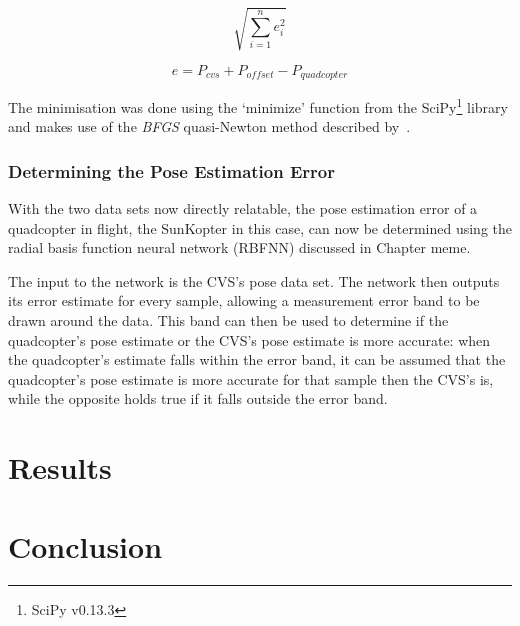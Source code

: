 \begin{equation}
  \label{eq:chap5-err-func}
  \sqrt{\displaystyle\sum_{i=1}^{n} e_i^2}
\end{equation}

\begin{equation}
  \label{eq:chap5-err-term}
  e = P_{cvs} + P_{offset} - P_{quadcopter}
\end{equation}

The minimisation was done using the `minimize' function from the SciPy\footnote{SciPy v0.13.3} library and makes use of the \emph{BFGS} quasi-Newton method described by~\cite{nocedal2006numerical}. 

\subsubsection{Determining the Pose Estimation Error}

With the two data sets now directly relatable, the pose estimation error of a quadcopter in flight, the SunKopter in this case, can now be determined using the radial basis function neural network (RBFNN) discussed in Chapter meme. 

The input to the network is the CVS's pose data set. The network then outputs its error estimate for every sample, allowing a measurement error band to be drawn around the data. This band can then be used to determine if the quadcopter's pose estimate or the CVS's pose estimate is more accurate: when the quadcopter's estimate falls within the error band, it can be assumed that the quadcopter's pose estimate is more accurate for that sample then the CVS's is, while the opposite holds true if it falls outside the error band. 

\section{Results}

\section{Conclusion}


